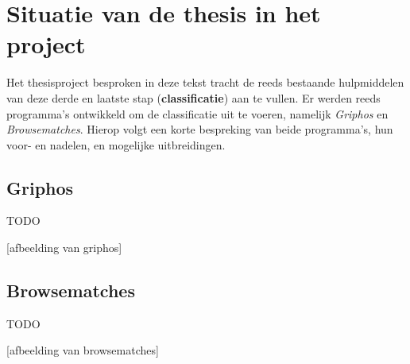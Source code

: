 \section{Situatie van de thesis in het project}
Het thesisproject besproken in deze tekst tracht de reeds bestaande hulpmiddelen van deze derde en laatste stap (\textbf{classificatie}) aan te vullen. Er werden reeds programma's ontwikkeld om de classificatie uit te voeren, namelijk \emph{Griphos} en \emph{Browsematches}. Hierop volgt een korte bespreking van beide programma's, hun voor- en nadelen, en mogelijke uitbreidingen.

\subsection{Griphos}

TODO

[afbeelding van griphos]

\subsection{Browsematches}

TODO

[afbeelding van browsematches]

